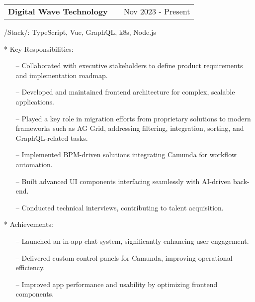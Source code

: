 \documentclass[a4paper,12pt]{article}
\makeatletter
\newenvironment{joblong}[2]
    {
    \begin{tabularx}{\linewidth}{@{}l X r@{}}
    \textbf{#1} & \hfill &  #2 \\[3.75pt]
    \end{tabularx}
    \begin{minipage}[t]{\linewidth}
    \begin{itemize}[nosep,after=\strut, leftmargin=1em, itemsep=3pt,label=--]
    }
    {
    \end{itemize}
    \end{minipage}    
    }
\makeatother
\begin{document}
\begin{joblong}{Digital Wave Technology}{Nov 2023 - Present}
  \item /Stack/: {TypeScript, Vue, GraphQL, k8s, Node.js}
{\fontsize{13.2pt}{14.6pt}\selectfont
  \item[*] Key Responsibilities:
    \begin{itemize}
      \item[--] Collaborated with executive stakeholders to define product requirements and implementation roadmap.
      \item[--] Developed and maintained frontend architecture for complex, scalable applications.
      \item[--] Played a key role in migration efforts from proprietary solutions to modern frameworks such as AG Grid, addressing filtering, integration, sorting, and GraphQL-related tasks.
      \item[--] Implemented BPM-driven solutions integrating Camunda for workflow automation.
      \item[--] Built advanced UI components interfacing seamlessly with AI-driven back-end.
      \item[--] Conducted technical interviews, contributing to talent acquisition.
    \end{itemize}

  \item[*] Achievements:
    \begin{itemize}
      \item[--] Launched an in-app chat system, significantly enhancing user engagement.
      \item[--] Delivered custom control panels for Camunda, improving operational efficiency.
      \item[--] Improved app performance and usability by optimizing frontend components.
    \end{itemize}
}
\end{joblong}
\end{document}
